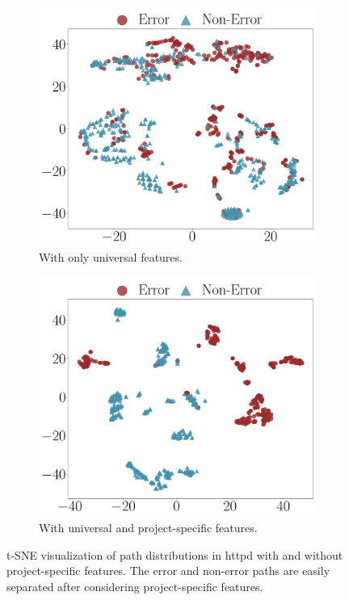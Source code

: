 \documentclass[12pt]{report}	%
\begin{document}
\begin{figure}
\centering
\begin{subfigure}[b]{0.5\textwidth}
	\centering
    \includegraphics[width=.85\linewidth]{images/httpd_uni_feats.pdf}
    \caption{With only universal features.}
     \label{fig:distri2:uni}
\end{subfigure}%
\hfill
\begin{subfigure}[b]{0.5\textwidth}
	\centering
    \includegraphics[width=.85\linewidth]{images/httpd_all_feats.pdf}
    \caption{With universal and project-specific features.}
    \label{fig:distri2:all}
\end{subfigure}
\caption{t-SNE visualization of path distributions in httpd with and without project-specific features.
The error and non-error paths are easily separated after considering project-specific features.}
\label{fig:distri2}
\end{figure}
\end{document}
